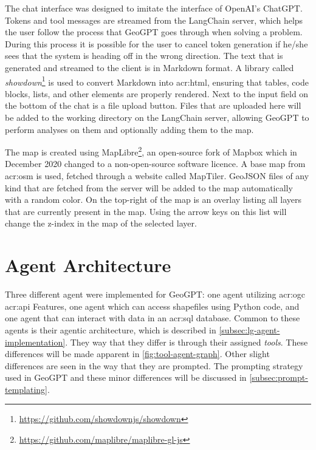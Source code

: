 The chat interface was designed to imitate the interface of OpenAI's ChatGPT. Tokens and tool messages are streamed from the LangChain server, which helps the user follow the process that GeoGPT goes through when solving a problem. During this process it is possible for the user to cancel token generation if he/she sees that the system is heading off in the wrong direction. The text that is generated and streamed to the client is in Markdown format. A library called \textit{showdown}\footnote{\url{https://github.com/showdownjs/showdown}} is used to convert Markdown into \acrshort{acr:html}, ensuring that tables, code blocks, lists, and other elements are properly rendered. Next to the input field on the bottom of the chat is a file upload button. Files that are uploaded here will be added to the working directory on the LangChain server, allowing GeoGPT to perform analyses on them and optionally adding them to the map.

The map is created using MapLibre\footnote{\url{https://github.com/maplibre/maplibre-gl-js}}, an open-source fork of Mapbox which in December 2020 changed to a non-open-source software licence. A base map from \gls{acr:osm} is used, fetched through a website called MapTiler. GeoJSON files of any kind that are fetched from the server will be added to the map automatically with a random color. On the top-right of the map is an overlay listing all layers that are currently present in the map. Using the arrow keys on this list will change the z-index in the map of the selected layer.



\section{Agent Architecture}

Three different agent were implemented for GeoGPT: one agent utilizing \acrshort{acr:ogc} \acrshort{acr:api} Features, one agent which can access shapefiles using Python code, and one agent that can interact with data in an \acrshort{acr:sql} database. Common to these agents is their agentic architecture, which is described in \autoref{subsec:lg-agent-implementation}. They way that they differ is through their assigned \textit{tools}. These differences will be made apparent in \autoref{fig:tool-agent-graph}. Other slight differences are seen in the way that they are prompted. The prompting strategy used in GeoGPT and these minor differences will be discussed in \autoref{subsec:prompt-templating}.

